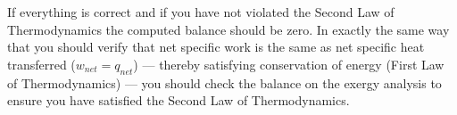 If everything is correct and if you have not violated the Second Law of Thermodynamics the computed balance should be zero.  In exactly the same way that you should verify that net specific work is the same as net specific heat transferred ($w_{net} = q_{net}$) --- thereby satisfying conservation of energy (First Law of Thermodynamics) --- you should check the balance on the exergy analysis to ensure you have satisfied the Second Law of Thermodynamics.

